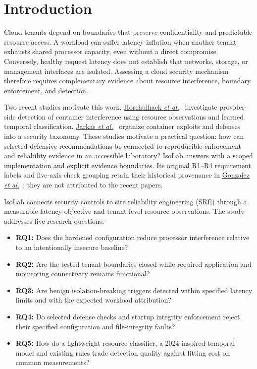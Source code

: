 \documentclass[conference,letterpaper]{IEEEtran}
\begin{document}
\section{Introduction}
Cloud tenants depend on boundaries that preserve confidentiality and predictable resource access. A workload can suffer latency inflation when another tenant exhausts shared processor capacity, even without a direct compromise. Conversely, healthy request latency does not establish that networks, storage, or management interfaces are isolated. Assessing a cloud security mechanism therefore requires complementary evidence about resource interference, boundary enforcement, and detection.

Two recent studies motivate this work. \href{https://doi.org/10.1016/j.jnca.2024.103839}{Horchulhack \emph{et al.}}~\cite{qos2024} investigate provider-side detection of container interference using resource observations and learned temporal classification. \href{https://doi.org/10.1145/3715001}{Jarkas \emph{et al.}}~\cite{acm2025} organize container exploits and defenses into a security taxonomy. These studies motivate a practical question: how can selected defensive recommendations be connected to reproducible enforcement and reliability evidence in an accessible laboratory? IsoLab answers with a scoped implementation and explicit evidence boundaries. Its original R1--R4 requirement labels and five-axis check grouping retain their historical provenance in \href{https://doi.org/10.1186/2192-113X-1-11}{Gonzalez \emph{et al.}}~\cite{gonzalez}; they are not attributed to the recent papers.

IsoLab connects security controls to site reliability engineering (SRE) through a measurable latency objective and tenant-level resource observations. The study addresses five research questions:
\begin{itemize}
\item \textbf{RQ1:} Does the hardened configuration reduce processor interference relative to an intentionally insecure baseline?
\item \textbf{RQ2:} Are the tested tenant boundaries closed while required application and monitoring connectivity remains functional?
\item \textbf{RQ3:} Are benign isolation-breaking triggers detected within specified latency limits and with the expected workload attribution?
\item \textbf{RQ4:} Do selected defense checks and startup integrity enforcement reject their specified configuration and file-integrity faults?
\item \textbf{RQ5:} How do a lightweight resource classifier, a 2024-inspired temporal model and existing rules trade detection quality against fitting cost on common measurements?
\end{itemize}
\end{document}
